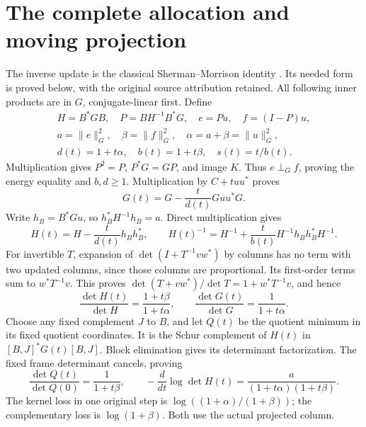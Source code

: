 \documentclass[11pt]{article}
\begin{document}
\section{The complete allocation and moving projection}
The inverse update is the classical Sherman--Morrison identity
\cite{ACCSM}. Its needed form is proved below, with the original
source attribution retained.
All following inner products are in \(G\), conjugate-linear first.
Define
\begin{equation}\tag{ACC3}
\begin{gathered}
H=B^*GB,\quad P=BH^{-1}B^*G,\quad e=Pu,\quad f=(I-P)u,\\
a=\|e\|_G^2,\quad\beta=\|f\|_G^2,\quad\alpha=a+\beta=\|u\|_G^2,\\
d(t)=1+t\alpha,\quad b(t)=1+t\beta,\quad s(t)=t/b(t).
\end{gathered}
\end{equation}
Multiplication gives \(P^2=P\), \(P^*G=GP\), and image \(K\).
Thus \(e\perp_G f\), proving the energy equality and \(b,d\ge1\).
Multiplication by \(C+tuu^*\) proves
\begin{equation}\tag{ACC4}
G(t)=G-\frac{t}{d(t)}Guu^*G.
\end{equation}
Write \(h_B=B^*Gu\), so \(h_B^*H^{-1}h_B=a\). Direct multiplication gives
\begin{equation}\tag{ACC5}
H(t)=H-\frac{t}{d(t)}h_Bh_B^*,\qquad
H(t)^{-1}=H^{-1}+\frac{t}{b(t)}H^{-1}h_Bh_B^*H^{-1}.
\end{equation}
For invertible \(T\), expansion of \(\det(I+T^{-1}vw^*)\) by columns
has no term with two updated columns, since those columns are
proportional. Its first-order terms sum to \(w^*T^{-1}v\).
This proves \(\det(T+vw^*)/\det T=1+w^*T^{-1}v\), and hence
\begin{equation}\tag{ACC6}
\boxed{\frac{\det H(t)}{\det H}=\frac{1+t\beta}{1+t\alpha},\qquad
\frac{\det G(t)}{\det G}=\frac1{1+t\alpha}.}
\end{equation}
Choose any fixed complement \(J\) to \(B\), and let \(Q(t)\) be
the quotient minimum in its fixed quotient coordinates. It is the
Schur complement of \(H(t)\) in \([B,J]^*G(t)[B,J]\).
Block elimination gives its determinant factorization. The fixed
frame determinant cancels, proving
\begin{equation}\tag{ACC7}
\boxed{\frac{\det Q(t)}{\det Q(0)}=\frac1{1+t\beta},\qquad
-\frac{d}{dt}\log\det H(t)=
\frac{a}{(1+t\alpha)(1+t\beta)}.}
\end{equation}
The kernel loss in one original step is
\(\log((1+\alpha)/(1+\beta))\); the complementary loss is
\(\log(1+\beta)\). Both use the actual projected column.
\end{document}
